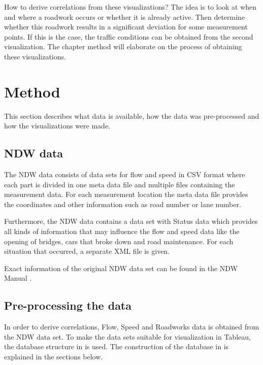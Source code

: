 \documentclass[sigconf]{acmart}
\begin{document}
\noindent How to derive correlations from these visualizations? The idea is to look at when and where a roadwork occurs or whether it is already active. Then determine whether this roadwork results in a significant deviation for some measurement points. If this is the case, the traffic conditions can be obtained from the second visualization. The chapter method will elaborate on the process of obtaining these visualizations.

\section{Method}
This section describes what data is available, how the data was pre-processed and how the visualizations were made.

\subsection{NDW data}
The NDW data consists of data sets for flow and speed in CSV format where each part is divided in one meta data file and multiple files containing the measurement data. For each measurement location the meta data file provides the coordinates and other information such as road number or lane number.

Furthermore, the NDW data contains a data set with Status data which provides all kinds of information that may influence the flow and speed data like the opening of bridges, cars that broke down and road maintenance. For each situation that occurred, a separate XML file is given.

Exact information of the original NDW data set can be found in the NDW Manual \cite{NDW_Manual}.

\subsection{Pre-processing the data}
In order to derive correlations, Flow, Speed and Roadworks data is obtained from the NDW data set. To make the data sets suitable for visualization in Tableau, the database structure in  is used. The construction of the database in  is explained in the sections below.

\end{document}
